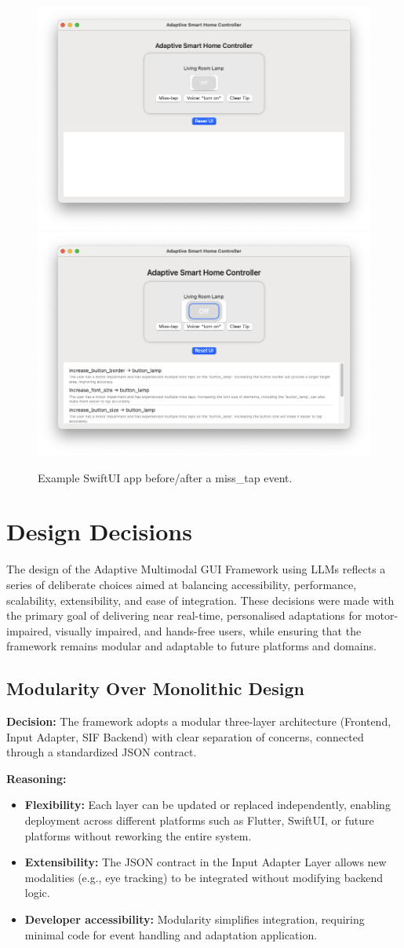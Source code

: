 \begin{figure}[h]
\centering
\includegraphics[width=.5\linewidth]{images/fig_swift_before.png}\hfill
\includegraphics[width=.5\linewidth]{images/fig_swift_after.png}
\caption{Example SwiftUI app before/after a miss\_tap event.}
\label{fig:swift-adapt}
\end{figure}

\section{Design Decisions}
The design of the Adaptive Multimodal GUI Framework using LLMs reflects a series of deliberate choices aimed at balancing accessibility, performance, scalability, extensibility, and ease of integration. These decisions were made with the primary goal of delivering near real-time, personalised adaptations for motor-impaired, visually impaired, and hands-free users, while ensuring that the framework remains modular and adaptable to future platforms and domains.

\subsection{Modularity Over Monolithic Design}
\textbf{Decision:} The framework adopts a modular three-layer architecture (Frontend, Input Adapter, SIF Backend) with clear separation of concerns, connected through a standardized JSON contract.

\textbf{Reasoning:}
\begin{itemize}
    \item \textbf{Flexibility:} Each layer can be updated or replaced independently, enabling deployment across different platforms such as Flutter, SwiftUI, or future platforms without reworking the entire system.
    \item \textbf{Extensibility:} The JSON contract in the Input Adapter Layer allows new modalities (e.g., eye tracking) to be integrated without modifying backend logic.
    \item \textbf{Developer accessibility:} Modularity simplifies integration, requiring minimal code for event handling and adaptation application.
\end{itemize}


